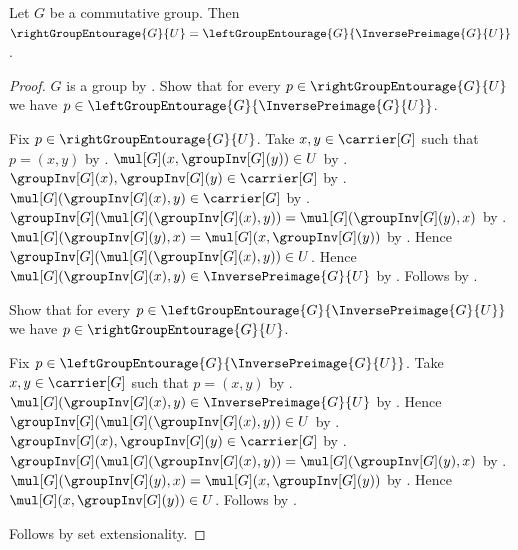 \begin{proposition}\label{commutative_right_group_entourage_as_left}
    Let $G$ be a commutative group.
    Then $\rightGroupEntourage{G}{U}
        =\leftGroupEntourage{G}{\InversePreimage{G}{U}}$.
\end{proposition}
\begin{proof}
    $G$ is a group by .
    Show that for every $p\in\rightGroupEntourage{G}{U}$ we have
        $p\in\leftGroupEntourage{G}{\InversePreimage{G}{U}}$.
    \begin{subproof}
        Fix $p\in\rightGroupEntourage{G}{U}$.
        Take $x,y\in\carrier[G]$ such that $p=(x,y)$
            by .
        $\mul[G](x,\groupInv[G](y))\in U$
            by .
        $\groupInv[G](x),\groupInv[G](y)\in\carrier[G]$
            by .
        $\mul[G](\groupInv[G](x),y)\in\carrier[G]$
            by .
        $\groupInv[G](\mul[G](\groupInv[G](x),y))
            =\mul[G](\groupInv[G](y),x)$
            by .
        $\mul[G](\groupInv[G](y),x)
            =\mul[G](x,\groupInv[G](y))$
            by .
        Hence $\groupInv[G](\mul[G](\groupInv[G](x),y))\in U$.
        Hence $\mul[G](\groupInv[G](x),y)
            \in\InversePreimage{G}{U}$ by .
        Follows by .
    \end{subproof}
    Show that for every
        $p\in\leftGroupEntourage{G}{\InversePreimage{G}{U}}$ we have
        $p\in\rightGroupEntourage{G}{U}$.
    \begin{subproof}
        Fix $p\in\leftGroupEntourage{G}{\InversePreimage{G}{U}}$.
        Take $x,y\in\carrier[G]$ such that $p=(x,y)$
            by .
        $\mul[G](\groupInv[G](x),y)
            \in\InversePreimage{G}{U}$
            by .
        Hence $\groupInv[G](\mul[G](\groupInv[G](x),y))\in U$
            by .
        $\groupInv[G](x),\groupInv[G](y)\in\carrier[G]$
            by .
        $\groupInv[G](\mul[G](\groupInv[G](x),y))
            =\mul[G](\groupInv[G](y),x)$
            by .
        $\mul[G](\groupInv[G](y),x)
            =\mul[G](x,\groupInv[G](y))$
            by .
        Hence $\mul[G](x,\groupInv[G](y))\in U$.
        Follows by .
    \end{subproof}
    Follows by set extensionality.
\end{proof}

